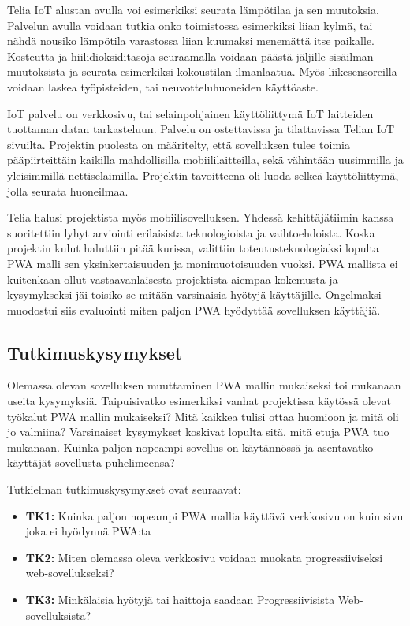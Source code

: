 \documentclass{tktltiki}
\begin{document}
Telia IoT alustan avulla voi esimerkiksi seurata lämpötilaa ja sen muutoksia. Palvelun avulla voidaan tutkia onko toimistossa esimerkiksi liian kylmä, tai nähdä nousiko lämpötila varastossa liian kuumaksi menemättä itse paikalle. Kosteutta ja hiilidioksiditasoja seuraamalla voidaan päästä jäljille sisäilman muutoksista ja seurata esimerkiksi kokoustilan ilmanlaatua. Myös liikesensoreilla voidaan laskea työpisteiden, tai neuvotteluhuoneiden käyttöaste. 

IoT palvelu on verkkosivu, tai selainpohjainen käyttöliittymä IoT laitteiden tuottaman datan tarkasteluun. Palvelu on ostettavissa ja tilattavissa Telian IoT sivuilta. Projektin puolesta on määritelty, että sovelluksen tulee toimia pääpiirteittäin kaikilla mahdollisilla mobiililaitteilla, sekä vähintään uusimmilla ja yleisimmillä nettiselaimilla. Projektin tavoitteena oli luoda selkeä käyttöliittymä, jolla seurata huoneilmaa. 

Telia halusi projektista myös mobiilisovelluksen. Yhdessä kehittäjätiimin kanssa suoritettiin lyhyt arviointi erilaisista teknologioista ja vaihtoehdoista. Koska projektin kulut haluttiin pitää kurissa, valittiin toteutusteknologiaksi lopulta PWA malli sen yksinkertaisuuden ja monimuotoisuuden vuoksi. PWA mallista ei kuitenkaan ollut vastaavanlaisesta projektista aiempaa kokemusta ja kysymykseksi jäi toisiko se mitään varsinaisia hyötyjä käyttäjille. Ongelmaksi muodostui siis evaluointi miten paljon PWA hyödyttää sovelluksen käyttäjiä.

\subsection{Tutkimuskysymykset}

Olemassa olevan sovelluksen muuttaminen PWA mallin mukaiseksi toi mukanaan useita kysymyksiä. Taipuisivatko esimerkiksi vanhat projektissa käytössä olevat työkalut PWA mallin mukaiseksi? Mitä kaikkea tulisi ottaa huomioon ja mitä oli jo valmiina? Varsinaiset kysymykset koskivat lopulta sitä, mitä etuja PWA tuo mukanaan. Kuinka paljon nopeampi sovellus on käytännössä ja asentavatko käyttäjät sovellusta puhelimeensa?

Tutkielman tutkimuskysymykset ovat seuraavat:

\begin{itemize}
  \item \textbf{TK1:} Kuinka paljon nopeampi PWA mallia käyttävä verkkosivu on kuin sivu joka ei hyödynnä PWA:ta
  \item \textbf{TK2:} Miten olemassa oleva verkkosivu voidaan muokata progressiiviseksi web-sovellukseksi?
  \item \textbf{TK3:} Minkälaisia hyötyjä tai haittoja saadaan Progressiivisista Web-sovelluksista? 
\end{itemize}
\end{document}
